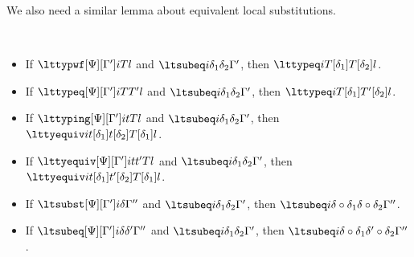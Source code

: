 We also need a similar lemma about equivalent local substitutions.
\begin{lemma}$ $
  \begin{itemize}
  \item If $\lttypwf[\Psi][\Gamma']i T l$ and $\ltsubeq i{\delta_1}{\delta_2}{\Gamma'}$, then
    $\lttypeq i{T[\delta_1]}{T[\delta_2]} l$.
  \item If $\lttypeq[\Psi][\Gamma']i T{T'} l$ and $\ltsubeq i{\delta_1}{\delta_2}{\Gamma'}$, then
    $\lttypeq i{T[\delta_1]}{T'[\delta_2]} l$.
  \item If $\lttyping[\Psi][\Gamma']i t T l$ and $\ltsubeq i{\delta_1}{\delta_2}{\Gamma'}$, then
    $\lttyequiv i{t[\delta_1]}{t[\delta_2]}{T[\delta_1]} l$.
  \item If $\lttyequiv[\Psi][\Gamma']i t{t'} T l$ and $\ltsubeq i{\delta_1}{\delta_2}{\Gamma'}$, then
    $\lttyequiv i{t[\delta_1]}{t'[\delta_2]}{T[\delta_1]} l$.
  \item If $\ltsubst[\Psi][\Gamma'] i{\delta}{\Gamma''}$ and $\ltsubeq i{\delta_1}{\delta_2}{\Gamma'}$, then
    $\ltsubeq i{\delta \circ \delta_1}{\delta \circ \delta_2}{\Gamma''}$.
  \item If $\ltsubeq[\Psi][\Gamma'] i{\delta}{\delta'}{\Gamma''}$ and $\ltsubeq i{\delta_1}{\delta_2}{\Gamma'}$, then
    $\ltsubeq i{\delta \circ \delta_1}{\delta' \circ \delta_2}{\Gamma''}$.
  \end{itemize}
\end{lemma}
